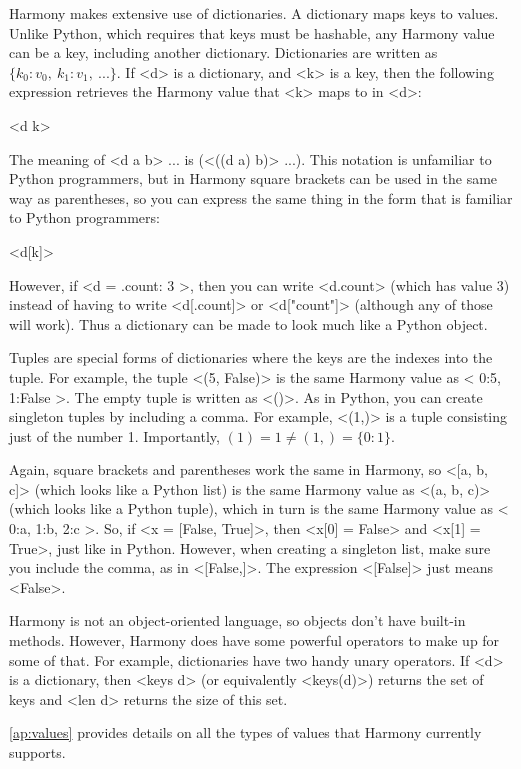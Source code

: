 \documentclass{report}
\newenvironment{code}{
\tcolorbox
}{
\endtcolorbox
}
\begin{document}
Harmony makes extensive use of dictionaries.
A dictionary maps keys to values.
Unlike Python, which requires that keys must be hashable,
any Harmony value can be a key, including another dictionary.
Dictionaries are written as
$\{ k_0: v_0, ~ k_1: v_1, ~ ... \}$.
If <{d}> is a dictionary, and <{k}> is a key, then the
following expression retrieves the Harmony value that <{k}> maps to in <{d}>:
\begin{code}
<{d k}>
\end{code}
The meaning of <{d a b}> $...$ is (<{((d a) b)}> $...$).
This notation is unfamiliar to Python programmers,
but in Harmony square brackets can be used
in the same way as parentheses, so you can express the same thing in the form
that is familiar to Python programmers:
\begin{code}
<{d[k]}>
\end{code}
However, if <{d = { .count: 3 }}>, then you can write
<{d.count}>
(which has value 3) instead of having to write
<{d[.count]}> or <{d["count"]}> (although any of those
will work).
Thus a dictionary can be made to look much like a Python object.

Tuples are special forms of dictionaries where the keys are
the indexes into the tuple.  For example, the tuple
<{(5, False)}> is the same Harmony value as
<{{ 0:5, 1:False }}>.
The empty tuple is written as <{()}>.
As in Python, you can create singleton tuples by including a comma.
For example, <{(1,)}> is a tuple consisting just of the number 1.
Importantly, $(1) = 1 \ne (1,) = \{ 0:1 \}$.

Again, square brackets and parentheses work the same in Harmony, so
<{[a, b, c]}> (which looks like a Python list)
is the same Harmony value as <{(a, b, c)}> (which looks like a Python tuple),
which in turn is the same Harmony value as <{{ 0:a, 1:b, 2:c }}>.
So, if <{x = [False, True]}>,
then <{x[0] = False}> and <{x[1] = True}>, just like in Python.
However, when creating a singleton list, make sure you include the
comma, as in <{[False,]}>.  The expression <{[False]}> just means
<{False}>.

Harmony is not an object-oriented language, so objects don't have
built-in methods.  However, Harmony does have some powerful operators to
make up for some of that.
For example, dictionaries have two handy unary operators.
If <{d}> is a
dictionary, then <{keys d}> (or equivalently <{keys(d)}>)
returns the set of keys and <{len d}> returns the size of
this set.

\autoref{ap:values} provides details on all the types of values that
Harmony currently supports.
\end{document}
